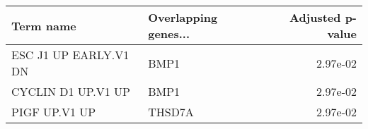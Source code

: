 \begin{tabular}{llr}
\toprule
            Term name & Overlapping genes... &  Adjusted p-value \\
\midrule
ESC J1 UP EARLY.V1 DN &                 BMP1 &          2.97e-02 \\
   CYCLIN D1 UP.V1 UP &                 BMP1 &          2.97e-02 \\
        PIGF UP.V1 UP &               THSD7A &          2.97e-02 \\
\bottomrule
\end{tabular}
